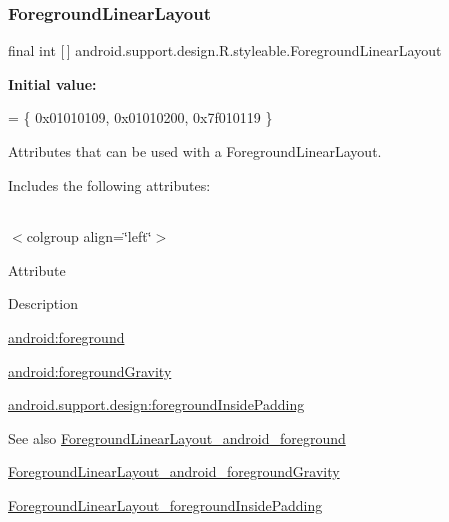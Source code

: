 \subsubsection{\texorpdfstring{Foreground\+Linear\+Layout}{ForegroundLinearLayout}}
{\footnotesize\ttfamily final int \mbox{[}$\,$\mbox{]} android.\+support.\+design.\+R.\+styleable.\+Foreground\+Linear\+Layout\hspace{0.3cm}{\ttfamily [static]}}

{\bfseries Initial value\+:}
\begin{DoxyCode}
= \{
            0x01010109, 0x01010200, 0x7f010119
        \}
\end{DoxyCode}
Attributes that can be used with a Foreground\+Linear\+Layout. 

Includes the following attributes\+:

\tabulinesep=1mm
\begin{longtabu} spread 0pt [c]{*{0}{|X[-1]}|}
\hline
\end{longtabu}
$<$colgroup align=\char`\"{}left\char`\"{}$>$ 

Attribute

Description 

{\ttfamily \hyperlink{classandroid_1_1support_1_1design_1_1R_1_1styleable_af95f0f9cddcead7a566b9ea5c9aea266}{android\+:foreground}}

{\ttfamily \hyperlink{classandroid_1_1support_1_1design_1_1R_1_1styleable_afb66c4e2a1db5b71fe6b3edcdcaa6af7}{android\+:foreground\+Gravity}}

{\ttfamily \hyperlink{classandroid_1_1support_1_1design_1_1R_1_1styleable_a6e8162828ab75d4722e3d9afee641609}{android.\+support.\+design\+:foreground\+Inside\+Padding}}

\begin{DoxySeeAlso}{See also}
\hyperlink{classandroid_1_1support_1_1design_1_1R_1_1styleable_af95f0f9cddcead7a566b9ea5c9aea266}{Foreground\+Linear\+Layout\+\_\+android\+\_\+foreground} 

\hyperlink{classandroid_1_1support_1_1design_1_1R_1_1styleable_afb66c4e2a1db5b71fe6b3edcdcaa6af7}{Foreground\+Linear\+Layout\+\_\+android\+\_\+foreground\+Gravity} 

\hyperlink{classandroid_1_1support_1_1design_1_1R_1_1styleable_a6e8162828ab75d4722e3d9afee641609}{Foreground\+Linear\+Layout\+\_\+foreground\+Inside\+Padding} 
\end{DoxySeeAlso}
\mbox{\label{classandroid_1_1support_1_1design_1_1R_1_1styleable_af95f0f9cddcead7a566b9ea5c9aea266}} 
